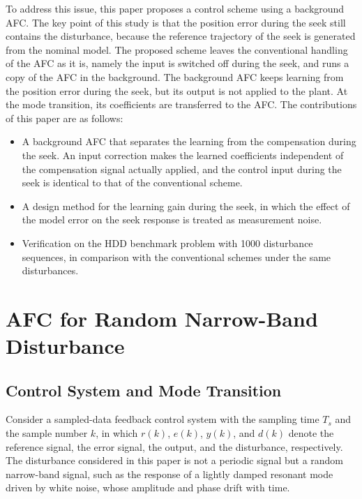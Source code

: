\documentclass[conference]{IEEEtran}
\newcommand{\Ts}{T_s}
\begin{document}
To address this issue, this paper proposes a control scheme using a background
AFC. The key point of this study is that the position error during the seek
still contains the disturbance, because the reference trajectory of the seek is
generated from the nominal model. The proposed scheme leaves the conventional
handling of the AFC as it is, namely the input is switched off during the seek,
and runs a copy of the AFC in the background. The background AFC keeps learning
from the position error during the seek, but its output is not applied to the
plant. At the mode transition, its coefficients are transferred to the AFC. The
contributions of this paper are as follows:
\begin{itemize}
\item A background AFC that separates the learning from the compensation
during the seek. An input correction makes the learned coefficients
independent of the compensation signal actually applied, and the control input
during the seek is identical to that of the conventional scheme.
\item A design method for the learning gain during the seek, in which the
effect of the model error on the seek response is treated as measurement
noise.
\item Verification on the HDD benchmark problem \cite{ieej_benchmark} with
1000 disturbance sequences, in comparison with the conventional schemes under
the same disturbances.
\end{itemize}

\section{AFC for Random Narrow-Band Disturbance}

\subsection{Control System and Mode Transition}
Consider a sampled-data feedback control system with the sampling time $\Ts$
and the sample number $k$, in which $r(k)$, $e(k)$, $y(k)$, and $d(k)$ denote
the reference signal, the error signal, the output, and the disturbance,
respectively. The disturbance considered in this paper is not a periodic
signal but a random narrow-band signal, such as the response of a lightly
damped resonant mode driven by white noise, whose amplitude and phase drift
with time.
\end{document}
